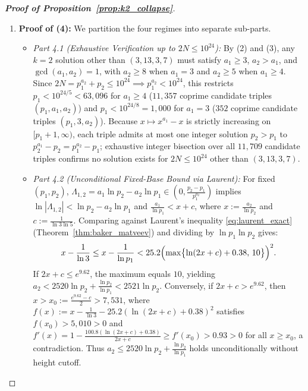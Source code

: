 \documentclass[11pt,a4paper]{article}
\theoremstyle{definition}
\begin{document}
\begin{proof}[\textbf{Proof of Proposition~\ref{prop:k2_collapse}}]
\begin{enumerate}
    \item \textbf{Proof of (4):} We partition the four regimes into separate sub-parts.
    \begin{itemize}
        \item \emph{Part 4.1 (Exhaustive Verification up to $2N \le 10^{24}$):} By (2) and (3), any $k = 2$ solution other than $(3, 13, 3, 7)$ must satisfy $a_1 \ge 3$, $a_2 > a_1$, and $\gcd(a_1, a_2) = 1$, with $a_2 \ge 8$ when $a_1 = 3$ and $a_2 \ge 5$ when $a_1 \ge 4$. Since $2N = p_1^{a_2} + p_2 \le 10^{24} \implies p_1^{a_2} < 10^{24}$, this restricts $p_1 < 10^{24/5} < 63{,}096$ for $a_1 \ge 4$ ($11{,}357$ coprime candidate triples $(p_1, a_1, a_2)$) and $p_1 < 10^{24/8} = 1{,}000$ for $a_1 = 3$ ($352$ coprime candidate triples $(p_1, 3, a_2)$). Because $x \mapsto x^{a_1} - x$ is strictly increasing on $[p_1 + 1, \infty)$, each triple admits at most one integer solution $p_2 > p_1$ to $p_2^{a_1} - p_2 = p_1^{a_2} - p_1$; exhaustive integer bisection over all $11{,}709$ candidate triples confirms no solution exists for $2N \le 10^{24}$ other than $(3, 13, 3, 7)$.

        \item \emph{Part 4.2 (Unconditional Fixed-Base Bound via Laurent):} For fixed $(p_1, p_2)$, $\Lambda_{1,2} = a_1 \ln p_2 - a_2 \ln p_1 \in (0, \frac{p_2 - p_1}{p_1^{a_2}})$ implies $\ln|\Lambda_{1,2}| < \ln p_2 - a_2 \ln p_1$ and $\frac{a_1}{\ln p_1} < x + c$, where $x := \frac{a_2}{\ln p_2}$ and $c := \frac{1}{\ln 3 \ln 5}$. Comparing against Laurent's inequality \eqref{eq:laurent_exact} (Theorem~\ref{thm:baker_matveev}) and dividing by $\ln p_1 \ln p_2$ gives:
        \[
        x - \frac{1}{\ln 3} \le x - \frac{1}{\ln p_1} < 25.2 \Bigl(\max\bigl\{\ln(2x + c) + 0.38, \, 10\bigr\}\Bigr)^2.
        \]
        If $2x + c \le e^{9.62}$, the maximum equals $10$, yielding $a_2 < 2520 \ln p_2 + \frac{\ln p_2}{\ln p_1} < 2521 \ln p_2$. Conversely, if $2x + c > e^{9.62}$, then $x > x_0 := \frac{e^{9.62} - c}{2} > 7{,}531$, where $f(x) := x - \frac{1}{\ln 3} - 25.2(\ln(2x + c) + 0.38)^2$ satisfies $f(x_0) > 5{,}010 > 0$ and $f'(x) = 1 - \frac{100.8(\ln(2x + c) + 0.38)}{2x + c} \ge f'(x_0) > 0.93 > 0$ for all $x \ge x_0$, a contradiction. Thus $a_2 \le 2520 \ln p_2 + \frac{\ln p_2}{\ln p_1}$ holds unconditionally without height cutoff.


\end{itemize}
\end{enumerate}
\end{proof}
\end{document}
